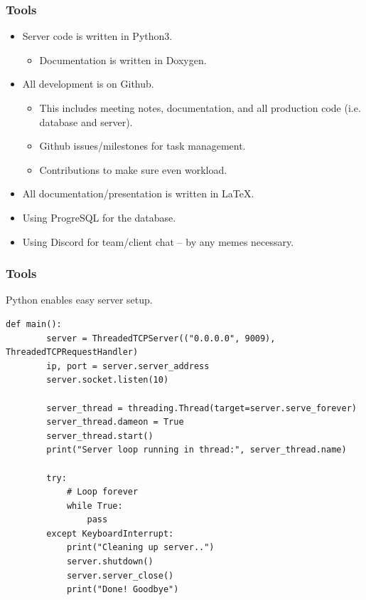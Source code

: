 \documentclass{beamer}
\newcounter{tools}
\begin{document}
\begin{frame}
    \frametitle{Tools }

    \begin{itemize}
        \item Server code is written in Python3.
        \begin{itemize}
            \item Documentation is written in Doxygen.
        \end{itemize}

        \item All development is on Github.
        \begin{itemize}
            \item This includes meeting notes, documentation, and all production code (i.e. database and server).
            \item Github issues/milestones for task management.
            \item Contributions to make sure even workload.
        \end{itemize}

        \item All documentation/presentation is written in \LaTeX{}.
        \item Using ProgreSQL for the database.
        \item Using Discord for team/client chat -- by any memes necessary.
    \end{itemize}
\end{frame}




\begin{frame}[fragile,c]
    \frametitle{Tools }

    Python enables easy server setup.

    \begin{lstlisting}[style=cpython]
    def main():
        server = ThreadedTCPServer(("0.0.0.0", 9009), ThreadedTCPRequestHandler)
        ip, port = server.server_address
        server.socket.listen(10)

        server_thread = threading.Thread(target=server.serve_forever)
        server_thread.dameon = True
        server_thread.start()
        print("Server loop running in thread:", server_thread.name)

        try:
            # Loop forever
            while True:
                pass
        except KeyboardInterrupt:
            print("Cleaning up server..")
            server.shutdown()
            server.server_close()
            print("Done! Goodbye")

    \end{lstlisting}
\end{frame}
\end{document}
